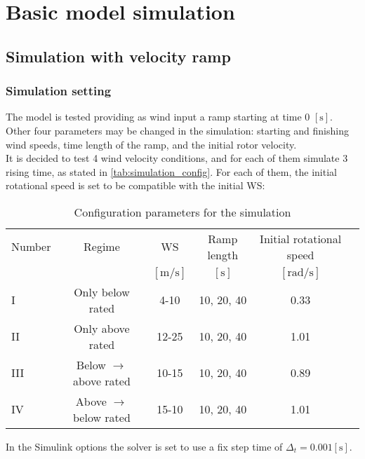 \newpage
\section{Basic model simulation}\label{sec:c_basic_model_simulation}

\subsection{Simulation with velocity ramp}
\subsubsection{Simulation setting}
The model is tested providing as wind input a ramp starting at time 0 $\left[\si{\second}\right]$. Other four parameters may be changed in the simulation: starting and finishing wind speeds, time length of the ramp, and the initial rotor velocity.\\
It is decided to test 4 wind velocity conditions, and for each of them simulate 3 rising time, as stated in \autoref{tab:simulation_config}. For each of them, the initial rotational speed is set to be compatible with the initial \acrshort{WS}:

\begin{table}[htb]
    \caption{Configuration parameters for the simulation}
    \centering
    \begin{tabular}{lccccc}
    \toprule
      Number & Regime  & WS & Ramp length & Initial rotational speed \\ 
       & & $\left[\si{\meter\per\second}\right]$ & $\left[\si{\second}\right]$ & $\left[\si{\radian\per\second}\right]$ \\ \midrule       
       I & Only below  rated & 4-10 & 10, 20, 40 & 0.33 \\
       II & Only above rated & 12-25 & 10, 20, 40 & 1.01 \\
       III & Below $\rightarrow$ above rated & 10-15 & 10, 20, 40 & 0.89 \\
       IV & Above $\rightarrow$ below rated & 15-10 & 10, 20, 40 & 1.01 \\
       \bottomrule
    \end{tabular}
    \label{tab:simulation_config}
\end{table}

In the Simulink options the solver is set to use a fix step time of $\Delta_t=0.001 \left[\si{\second}\right]$.

